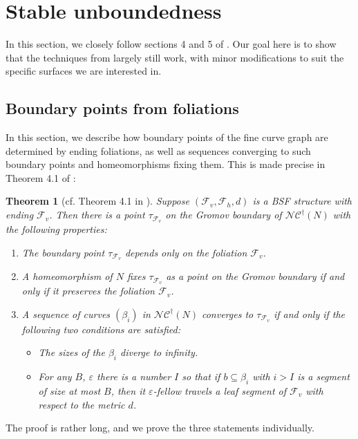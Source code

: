 \documentclass[10pt,a4paper]{amsart}
\let\epsilon\varepsilon
\newtheorem{theorem}{Theorem}[section]
\newcommand{\fncg}{\mathcal{NC}^\dagger}
\begin{document}
\section{Stable unboundedness}
In this section, we closely follow sections 4 and 5 of \cite{BHW2}.
Our goal here is to show that the techniques from \cite{BHW2} largely still work, with minor modifications to suit the specific surfaces we are interested in.

\subsection{Boundary points from foliations}\label{subsec:construct-bdary-points}
In this section, we describe how boundary points of the fine curve graph are determined by ending foliations, as well as sequences converging to such boundary points and homeomorphisms fixing them.
This is made precise in Theorem 4.1 of \cite{BHW2}:

\begin{theorem}[cf. Theorem 4.1 in \cite{BHW2}]\label{thm:convergence-criterion}
Suppose $(\mathcal{F}_v,\mathcal{F}_h,d)$ is a BSF structure with ending $\mathcal{F}_v$.
Then there is a point $\tau_{\mathcal{F}_v}$ on the Gromov boundary of $\fncg(N)$ with the following properties: \begin{enumerate}
    \item The boundary point $\tau_{\mathcal{F}_v}$ depends only on the foliation $\mathcal{F}_v$.
    \item A homeomorphism of $N$ fixes $\tau_{\mathcal{F}_v}$ as a point on the Gromov boundary if and only if it preserves the foliation $\mathcal{F}_v$.
    \item A sequence of curves $(\beta_i)$ in $\fncg(N)$ converges to $\tau_{\mathcal{F}_v}$ if and only if 
    the following two conditions are satisfied: \begin{itemize}
        \item The sizes of the $\beta_i$ diverge to infinity.
        \item For any $B$, $\epsilon$ there is a number $I$ so that if $b\subseteq \beta_i$ with $i>I$ is a segment of size at most $B$, then it $\epsilon$-fellow travels a leaf segment of $\mathcal{F}_v$ with respect to the metric $d$.
    \end{itemize}
     
\end{enumerate}
\end{theorem}

The proof is rather long, and we prove the three statements individually.
\end{document}
